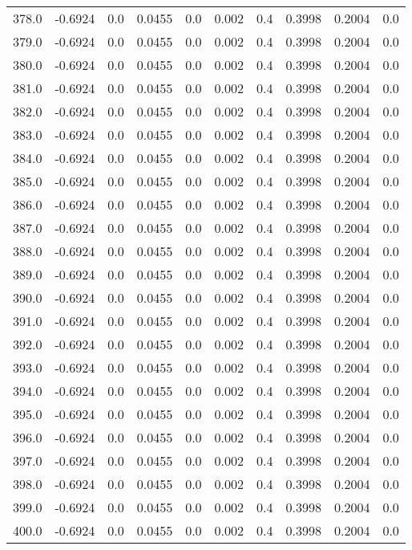 \begin{longtable}{lrrrrrrrrr}
378.0 & -0.6924 & 0.0 & 0.0455 & 0.0 & 0.002 & 0.4 & 0.3998 & 0.2004 & 0.0 \\
379.0 & -0.6924 & 0.0 & 0.0455 & 0.0 & 0.002 & 0.4 & 0.3998 & 0.2004 & 0.0 \\
380.0 & -0.6924 & 0.0 & 0.0455 & 0.0 & 0.002 & 0.4 & 0.3998 & 0.2004 & 0.0 \\
381.0 & -0.6924 & 0.0 & 0.0455 & 0.0 & 0.002 & 0.4 & 0.3998 & 0.2004 & 0.0 \\
382.0 & -0.6924 & 0.0 & 0.0455 & 0.0 & 0.002 & 0.4 & 0.3998 & 0.2004 & 0.0 \\
383.0 & -0.6924 & 0.0 & 0.0455 & 0.0 & 0.002 & 0.4 & 0.3998 & 0.2004 & 0.0 \\
384.0 & -0.6924 & 0.0 & 0.0455 & 0.0 & 0.002 & 0.4 & 0.3998 & 0.2004 & 0.0 \\
385.0 & -0.6924 & 0.0 & 0.0455 & 0.0 & 0.002 & 0.4 & 0.3998 & 0.2004 & 0.0 \\
386.0 & -0.6924 & 0.0 & 0.0455 & 0.0 & 0.002 & 0.4 & 0.3998 & 0.2004 & 0.0 \\
387.0 & -0.6924 & 0.0 & 0.0455 & 0.0 & 0.002 & 0.4 & 0.3998 & 0.2004 & 0.0 \\
388.0 & -0.6924 & 0.0 & 0.0455 & 0.0 & 0.002 & 0.4 & 0.3998 & 0.2004 & 0.0 \\
389.0 & -0.6924 & 0.0 & 0.0455 & 0.0 & 0.002 & 0.4 & 0.3998 & 0.2004 & 0.0 \\
390.0 & -0.6924 & 0.0 & 0.0455 & 0.0 & 0.002 & 0.4 & 0.3998 & 0.2004 & 0.0 \\
391.0 & -0.6924 & 0.0 & 0.0455 & 0.0 & 0.002 & 0.4 & 0.3998 & 0.2004 & 0.0 \\
392.0 & -0.6924 & 0.0 & 0.0455 & 0.0 & 0.002 & 0.4 & 0.3998 & 0.2004 & 0.0 \\
393.0 & -0.6924 & 0.0 & 0.0455 & 0.0 & 0.002 & 0.4 & 0.3998 & 0.2004 & 0.0 \\
394.0 & -0.6924 & 0.0 & 0.0455 & 0.0 & 0.002 & 0.4 & 0.3998 & 0.2004 & 0.0 \\
395.0 & -0.6924 & 0.0 & 0.0455 & 0.0 & 0.002 & 0.4 & 0.3998 & 0.2004 & 0.0 \\
396.0 & -0.6924 & 0.0 & 0.0455 & 0.0 & 0.002 & 0.4 & 0.3998 & 0.2004 & 0.0 \\
397.0 & -0.6924 & 0.0 & 0.0455 & 0.0 & 0.002 & 0.4 & 0.3998 & 0.2004 & 0.0 \\
398.0 & -0.6924 & 0.0 & 0.0455 & 0.0 & 0.002 & 0.4 & 0.3998 & 0.2004 & 0.0 \\
399.0 & -0.6924 & 0.0 & 0.0455 & 0.0 & 0.002 & 0.4 & 0.3998 & 0.2004 & 0.0 \\
400.0 & -0.6924 & 0.0 & 0.0455 & 0.0 & 0.002 & 0.4 & 0.3998 & 0.2004 & 0.0 \\

\end{longtable}
